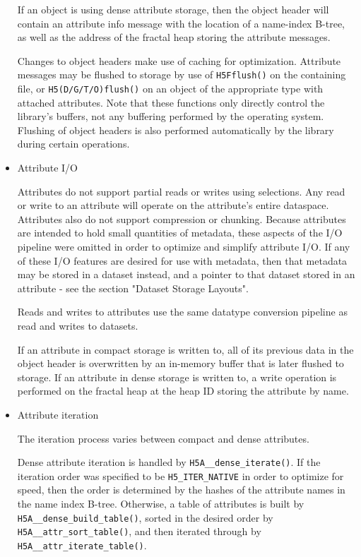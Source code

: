\begin{itemize}
If an object is using dense attribute storage, then the object header will contain an attribute info message with the location of a name-index B-tree, as well as the address of the fractal heap storing the attribute messages.

Changes to object headers make use of caching for optimization. Attribute messages may be flushed to storage by use of \texttt{H5Fflush()} on the containing file, or \texttt{H5(D/G/T/O)flush()} on an object of the appropriate type with attached attributes. Note that these functions only directly control the library's buffers, not any buffering performed by the operating system. Flushing of object headers is also performed automatically by the library during certain operations.

    \item Attribute I/O

Attributes do not support partial reads or writes using selections. Any read or write to an attribute will operate on the attribute's entire dataspace. Attributes also do not support compression or chunking. Because attributes are intended to hold small quantities of metadata, these aspects of the I/O pipeline were omitted in order to optimize and simplify attribute I/O. If any of these I/O features are desired for use with metadata, then that metadata may be stored in a dataset instead, and a pointer to that dataset stored in an attribute - see the section "Dataset Storage Layouts".

Reads and writes to attributes use the same datatype conversion pipeline as read and writes to datasets.

If an attribute in compact storage is written to, all of its previous data in the object header is overwritten by an in-memory buffer that is later flushed to storage. If an attribute in dense storage is written to, a write operation is performed on the fractal heap at the heap ID storing the attribute by name. 

    \item Attribute iteration

The iteration process varies between compact and dense attributes.

Dense attribute iteration is handled by \texttt{H5A\_\_dense\_iterate()}. If the iteration order was specified to be \texttt{H5\_ITER\_NATIVE} in order to optimize for speed, then the order is determined by the hashes of the attribute names in the name index B-tree. Otherwise, a table of attributes is built by \texttt{H5A\_\_dense\_build\_table()}, sorted in the desired order by \texttt{H5A\_\_attr\_sort\_table()}, and then iterated through by \texttt{H5A\_\_attr\_iterate\_table()}.


\end{itemize}
